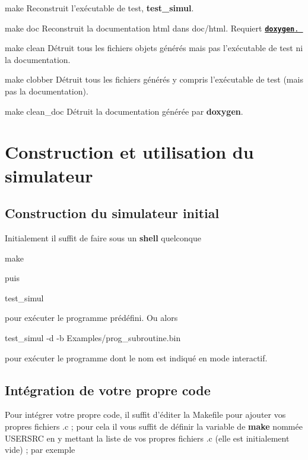 \begin{DoxyDescription}
\item[make ]\-Reconstruit l'exécutable de test, {\bfseries test\-\_\-simul}. 


\item[make doc ]\-Reconstruit la documentation html dans doc/html. \-Requiert \href{http://www.doxygen.org}{\tt {\bfseries doxygen}. }


\item[make clean  ]\-Détruit tous les fichiers objets générés mais pas l'exécutable de test ni la documentation.


\item[make clobber  ]\-Détruit tous les fichiers générés y compris l'exécutable de test (mais pas la documentation).


\item[make clean\-\_\-doc ]\-Détruit la documentation générée par {\bfseries doxygen}.  
\end{DoxyDescription}\hypertarget{index_build}{}\section{\-Construction et utilisation du simulateur}\label{index_build}
\hypertarget{index_build_init}{}\subsection{\-Construction du simulateur initial}\label{index_build_init}
\-Initialement il suffit de faire sous un {\bfseries shell} quelconque 
\begin{DoxyCode}
make
\end{DoxyCode}
 puis 
\begin{DoxyCode}
test_simul
\end{DoxyCode}
 pour exécuter le programme prédéfini. \-Ou alors 
\begin{DoxyCode}
test_simul -d -b Examples/prog_subroutine.bin
\end{DoxyCode}
 pour exécuter le programme dont le nom est indiqué en mode interactif.\hypertarget{index_build_yours}{}\subsection{\-Intégration de votre propre code}\label{index_build_yours}
\-Pour intégrer votre propre code, il suffit d'éditer la \-Makefile pour ajouter vos propres fichiers {\ttfamily }.c ; pour cela il vous suffit de définir la variable de {\bfseries make} nommée {\ttfamily \-U\-S\-E\-R\-S\-R\-C} en y mettant la liste de vos propres fichiers {\ttfamily }.c (elle est initialement vide) ; par exemple


